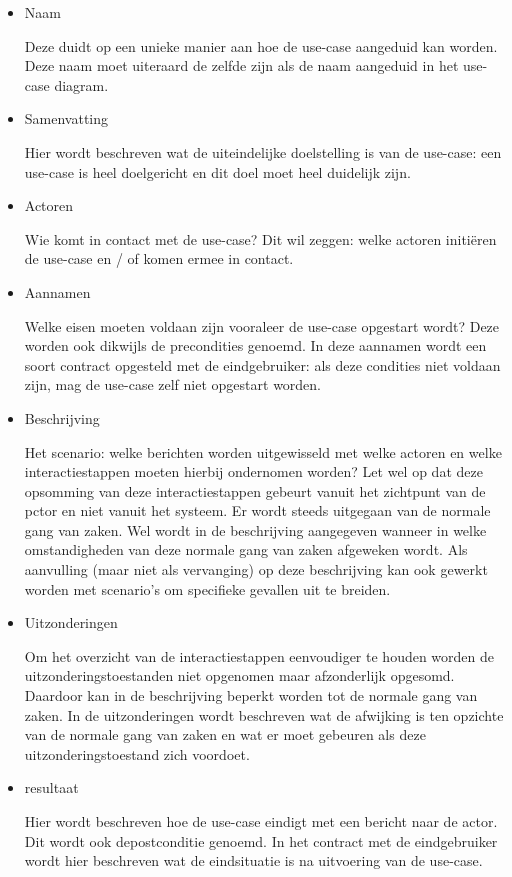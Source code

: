 \begin{itemize}
    \item Naam
    
    Deze duidt op een unieke manier aan hoe de use-case aangeduid kan worden. Deze naam moet uiteraard de zelfde zijn als de naam aangeduid in het use- case diagram.
    \item Samenvatting
    
    Hier wordt beschreven wat de uiteindelijke doelstelling is van de use-case: een use-case is heel doelgericht en dit doel moet heel duidelijk zijn.
    \item Actoren
    
    Wie komt in contact met de use-case? Dit wil zeggen: welke actoren initiëren de use-case en / of komen ermee in contact.
    \item Aannamen
    
    Welke eisen moeten voldaan zijn vooraleer de use-case opgestart wordt? Deze worden ook dikwijls de precondities genoemd.
In deze aannamen wordt een soort contract opgesteld met de eindgebruiker: als deze condities niet voldaan zijn, mag de use-case zelf niet opgestart worden.
    \item Beschrijving
    
    Het scenario: welke berichten worden uitgewisseld met welke actoren en welke interactiestappen moeten hierbij ondernomen worden? Let wel op dat deze opsomming van deze interactiestappen gebeurt vanuit het zichtpunt van de pctor en niet vanuit het systeem. Er wordt steeds uitgegaan van de normale gang van zaken. Wel wordt in de beschrijving aangegeven wanneer in welke omstandigheden van deze normale gang van zaken afgeweken wordt. Als aanvulling (maar niet als vervanging) op deze beschrijving kan ook gewerkt worden met scenario's om specifieke gevallen uit te breiden.
    \item Uitzonderingen
    
    Om het overzicht van de interactiestappen eenvoudiger te houden worden de uitzonderingstoestanden niet opgenomen maar afzonderlijk opgesomd. Daardoor kan in de beschrijving beperkt worden tot de normale gang van zaken. In de uitzonderingen wordt beschreven wat de afwijking is ten opzichte van de normale gang van zaken en wat er moet gebeuren als deze uitzonderingstoestand zich voordoet.
    
    \item resultaat
    
    Hier wordt beschreven hoe de use-case eindigt met een bericht naar de actor. Dit wordt ook depostconditie genoemd.
In het contract met de eindgebruiker wordt hier beschreven wat de eindsituatie is na uitvoering van de use-case.
\end{itemize}

